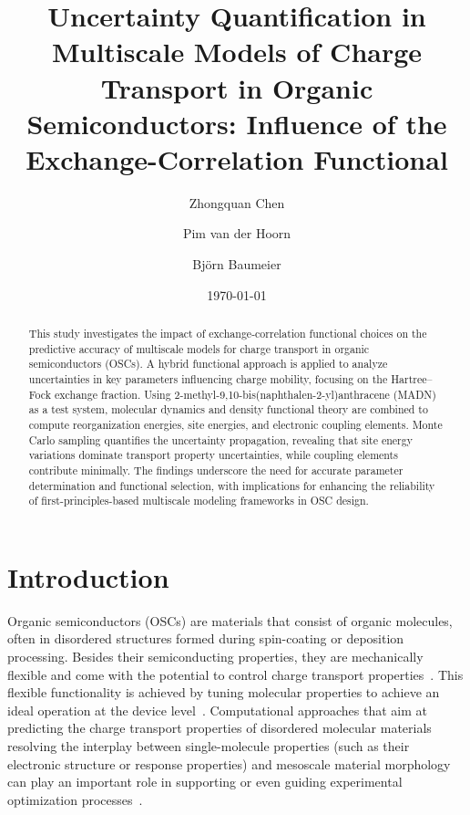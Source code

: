 \documentclass[%
 reprint,
superscriptaddress,
 amsmath,amssymb,
 aps,
prb,
floatfix
]{revtex4-2}
\begin{document}
\title{Uncertainty Quantification in Multiscale Models of Charge Transport in Organic Semiconductors: Influence of the Exchange-Correlation Functional}

\author{Zhongquan Chen}
\author{Pim van der Hoorn}
\author{Bj\"orn Baumeier}

\date{\today}

\begin{abstract}
This study investigates the impact of exchange-correlation functional choices on the predictive accuracy of multiscale models for charge transport in organic semiconductors (OSCs). A hybrid functional approach is applied to analyze uncertainties in key parameters influencing charge mobility, focusing on the Hartree--Fock exchange fraction. Using 2-methyl-9,10-bis(naphthalen-2-yl)anthracene (MADN) as a test system, molecular dynamics and density functional theory are combined to compute reorganization energies, site energies, and electronic coupling elements. Monte Carlo sampling quantifies the uncertainty propagation, revealing that site energy variations dominate transport property uncertainties, while coupling elements contribute minimally. The findings underscore the need for accurate parameter determination and functional selection, with implications for enhancing the reliability of first-principles-based multiscale modeling frameworks in OSC design.  
\end{abstract}

\maketitle

\section{Introduction}
Organic semiconductors (OSCs) are materials that consist of organic molecules, often in disordered structures formed during spin-coating or deposition processing. Besides their semiconducting properties, they are mechanically flexible and come with the potential to control charge transport properties~\cite{hamers_flexible_2001,liu_high_2015,chow_organic_2020}. This flexible functionality is achieved by tuning molecular properties to achieve an ideal operation at the device level~\cite{bronstein_role_2020, bredas_organic_2002}. Computational approaches that aim at predicting the charge transport properties of disordered molecular materials resolving the interplay between single-molecule properties (such as their electronic structure or response properties) and mesoscale material morphology can play an important role in supporting or even guiding experimental optimization processes~\cite{bronstein_role_2020, sokolov_computational_2011, grynova_read_2018}.
\end{document}
